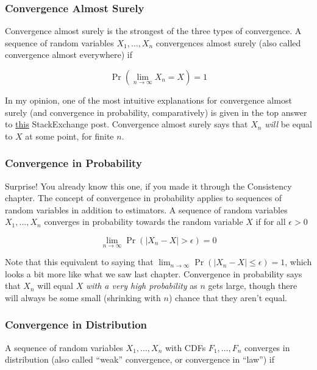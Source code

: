 \documentclass[
  letterpaper,
  DIV=11,
  numbers=noendperiod]{scrreprt}
\begin{document}
\subsubsection{Convergence Almost
Surely}\label{convergence-almost-surely}

Convergence almost surely is the strongest of the three types of
convergence. A sequence of random variables \(X_1, \dots, X_n\)
convergences almost surely (also called convergence almost everywhere)
if

\[
\Pr(\lim_{n \to \infty} X_n = X) = 1
\]

In my opinion, one of the most intuitive explanations for convergence
almost surely (and convergence in probability, comparatively) is given
in the top answer to
\href{https://stats.stackexchange.com/questions/2230/convergence-in-probability-vs-almost-sure-convergence}{this}
StackExchange post. Convergence almost surely says that \(X_n\)
\emph{will} be equal to \(X\) at some point, for finite \(n\).

\subsubsection{Convergence in
Probability}\label{convergence-in-probability}

Surprise! You already know this one, if you made it through the
Consistency chapter. The concept of convergence in probability applies
to sequences of random variables in addition to estimators. A sequence
of random variables \(X_1, \dots, X_n\) converges in probability towards
the random variable \(X\) if for all \(\epsilon > 0\)

\[
\lim_{n \to \infty} \Pr(|X_n - X | > \epsilon) = 0
\]

Note that this equivalent to saying that
\(\lim_{n \to \infty} \Pr(|X_n - X | \leq \epsilon) = 1\), which looks a
bit more like what we saw last chapter. Convergence in probability says
that \(X_n\) will equal \(X\) \emph{with a very high probability} as
\(n\) gets large, though there will always be some small (shrinking with
\(n\)) chance that they aren't equal.

\subsubsection{Convergence in
Distribution}\label{convergence-in-distribution}

A sequence of random variables \(X_1, \dots, X_n\) with CDFs
\(F_1, \dots, F_n\) converges in distribution (also called ``weak''
convergence, or convergence in ``law'') if
\end{document}
